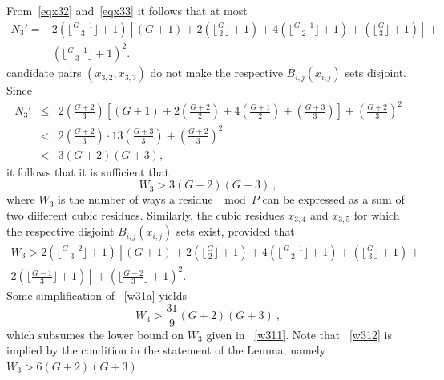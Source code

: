 \documentclass[12pt]{article} \pagestyle{plain} \topmargin
\begin{document}
From~\eqref{eqx32} and~\eqref{eqx33} it follows that at most
\begin{equation}\label{w31}\begin{array}{lll} N_3'=&2 \left( \lfloor \frac{G-1}{3}\rfloor +1\right) \left[
(G+1)+2\left( \lfloor \frac{G}{2}\rfloor +1\right) +4\left( \lfloor
\frac{G-1}{2}\rfloor +1\right) + \left( \lfloor \frac{G}{3}\rfloor
+1\right)\right]+ \\{}&\left( \lfloor \frac{G-1}{3}\rfloor
+1\right)^2.
\end{array}\end{equation}
candidate pairs $(x_{3,2},x_{3,3})$ do not make the respective
$B_{i,j}(x_{i,j})$ sets disjoint. Since
\begin{equation}\label{w31a}\begin{array}{lll}
N_3'& \leq &2\left( \frac{G+2}{3} \right) \left[ (G+1)+2\left(
\frac{G+2}{2}\right) +4\left( \frac{G+1}{2}\right) + \left(
\frac{G+3}{3}\right)\right]+\left(  \frac{G+2}{3}
\right)^2\\
{}&<&2\left( \frac{G+2}{3} \right) \cdot
13\left(\frac{G+3}{3}\right)+\left( \frac{G+2}{3} \right)^2\\
{}&<&3(G+2)(G+3),
\end{array}\end{equation} it follows that it is sufficient that
\begin{equation}\label{w311}
W_3 > 3 (G+2)(G+3)~,
\end{equation}
where $W_3$ is the number of ways a residue $\mod P$ can be
expressed as a sum of two different cubic residues. Similarly, the
cubic residues $x_{3,4}$ and $x_{3,5}$ for which the respective
disjoint $B_{i,j}(x_{i,j})$ sets  exist, provided that
\begin{equation}\label{w31a}\begin{array}{lll} W_3
> 2 \left( \lfloor \frac{G-2}{3}\rfloor +1\right)\left[
(G+1)+2\left( \lfloor \frac{G}{2}\rfloor +1\right) +4\left( \lfloor
\frac{G-1}{2}\rfloor +1\right)  +\left( \lfloor \frac{G}{3}\rfloor
+1\right)+\right.\\\left.2\left( \lfloor \frac{G-1}{3}\rfloor
+1\right)\right]+ \left( \lfloor \frac{G-2}{3}\rfloor +1\right)^2.
\end{array}\end{equation}
 Some simplification of ~\eqref{w31a} yields
\begin{equation}\label{w312}
W_3 > \frac{31}{9} (G+2)(G+3)~,
\end{equation}
which subsumes the lower bound on $W_3$ given in ~\eqref{w311}.
Note that ~\eqref{w312} is implied by the condition in the
statement of the Lemma, namely $W_3 >6(G+2)(G+3)$.
\end{document}
